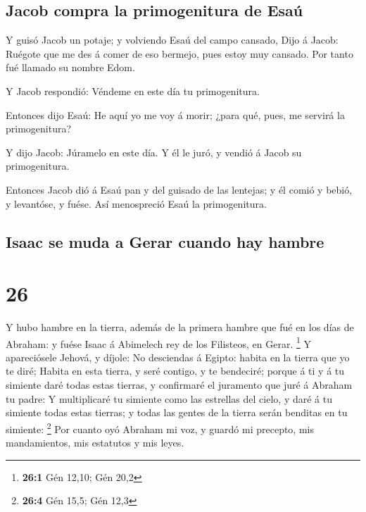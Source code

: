 \hypertarget{jacob-compra-la-primogenitura-de-esauxfa}{%
\subsection{Jacob compra la primogenitura de
Esaú}\label{jacob-compra-la-primogenitura-de-esauxfa}}

 Y guisó Jacob un potaje; y volviendo Esaú del campo
cansado,  Dijo á Jacob: Ruégote que me des á comer de eso
bermejo, pues estoy muy cansado. Por tanto fué llamado su nombre Edom.

 Y Jacob respondió: Véndeme en este día tu primogenitura.

 Entonces dijo Esaú: He aquí yo me voy á morir; ¿para qué,
pues, me servirá la primogenitura?

 Y dijo Jacob: Júramelo en este día. Y él le juró, y vendió
á Jacob su primogenitura.

 Entonces Jacob dió á Esaú pan y del guisado de las
lentejas; y él comió y bebió, y levantóse, y fuése. Así menospreció Esaú
la primogenitura.

\hypertarget{isaac-se-muda-a-gerar-cuando-hay-hambre}{%
\subsection{Isaac se muda a Gerar cuando hay
hambre}\label{isaac-se-muda-a-gerar-cuando-hay-hambre}}

\hypertarget{section-25}{%
\section{26}\label{section-25}}

 Y hubo hambre en la tierra, además de la primera hambre que
fué en los días de Abraham: y fuése Isaac á Abimelech rey de los
Filisteos, en Gerar. \footnote{\textbf{26:1} Gén 12,10; Gén 20,2}
 Y apareciósele Jehová, y díjole: No desciendas á Egipto:
habita en la tierra que yo te diré;  Habita en esta tierra,
y seré contigo, y te bendeciré; porque á ti y á tu simiente daré todas
estas tierras, y confirmaré el juramento que juré á Abraham tu padre:
 Y multiplicaré tu simiente como las estrellas del cielo, y
daré á tu simiente todas estas tierras; y todas las gentes de la tierra
serán benditas en tu simiente: \footnote{\textbf{26:4} Gén 15,5; Gén
  12,3}  Por cuanto oyó Abraham mi voz, y guardó mi
precepto, mis mandamientos, mis estatutos y mis leyes.

